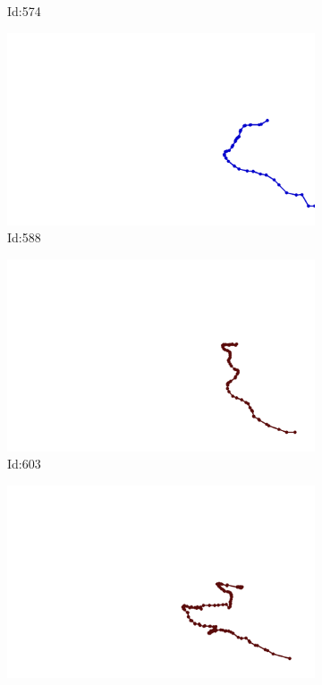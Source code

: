 \documentclass[12pt,twoside]{report}
\begin{document}
\begin{figure}
\begin{subfigure}[b]{0.20\textwidth}
\caption{Id:574}
\end{subfigure}
\begin{subfigure}[b]{0.20\textwidth}
\centering
\includegraphics[width=\textwidth]{../trajectories/588.png}
\caption{Id:588}
\end{subfigure}
\begin{subfigure}[b]{0.20\textwidth}
\centering
\includegraphics[width=\textwidth]{../trajectories/603.png}
\caption{Id:603}
\end{subfigure}
\begin{subfigure}[b]{0.20\textwidth}
\centering
\includegraphics[width=\textwidth]{../trajectories/652.png}

\end{subfigure}
\end{figure}
\end{document}
